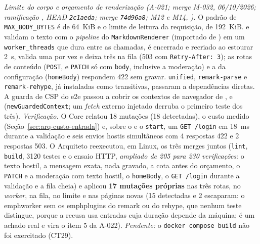 \emph{Limite do corpo e orçamento de renderização (A-021; merge M-032, 06/10/2026; ramificação , HEAD \texttt{2c1aeda}; merge \texttt{74d96a8}; M12 e M14, ).} O padrão de \texttt{MAX\_BODY\_BYTES} é de 64~KiB e o limite de leitura da requisição, de 192~KiB.  e  validam o texto com o \emph{pipeline} do \texttt{MarkdownRenderer} (importado de ) em um \texttt{worker\_threads} que dura entre as chamadas, é encerrado e recriado ao estourar 2~s, valida uma por vez e deixa três na fila (503  com \texttt{Retry-After: 3}); as rotas de conteúdo (\texttt{POST}, e \texttt{PATCH} só com \texttt{body}, inclusive a moderação) e a da configuração (\texttt{homeBody}) respondem 422  sem gravar. \texttt{unified}, \texttt{remark-parse} e \texttt{remark-rehype}, já instaladas como transitivas, passaram a dependências diretas. A guarda de CSP do e2e passou a cobrir os contextos de navegador de ,  e  (\texttt{newGuardedContext}; um \emph{fetch} externo injetado derruba o primeiro teste dos três). \emph{Verificação.} O Core relatou 18 mutações (18 detectadas), o custo medido (Seção~\ref{sec:arq-custo-entrada}) e, sobre o  e o \texttt{start}, um \texttt{GET /login} em 18~ms durante a validação e seis envios hostis simultâneos com 4 respostas 422 e 2 respostas 503. O Arquiteto reexecutou, em Linux, os três merges juntos (\texttt{lint}, \texttt{build}, 3120 testes e o ensaio HTTP, \emph{ampliado de 205 para 230 verificações}: o texto hostil, a mensagem exata, nada gravado, a cota antes do orçamento, o \texttt{PATCH} e a moderação com texto hostil, o \texttt{homeBody}, o \texttt{GET /login} durante a validação e a fila cheia) e aplicou \textbf{17 mutações próprias} nas três rotas, no \emph{worker}, na fila, no limite e nas páginas novas (15 detectadas e 2 escaparam: o emph{worker} sem os emph{plugins} do remark ou do rehype, que nenhum teste distingue, porque a recusa usa entradas cuja duração depende da máquina; é um achado real e vira o item 5 da A-022). \emph{Pendente:} o \texttt{docker compose build} não foi exercitado (CT29).

